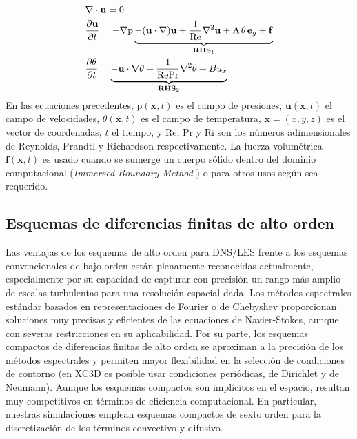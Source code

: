 \begin{equation}
\begin{aligned}
&\nabla \cdot \mathbf{u} = 0 \\
& \frac{\partial \mathbf{u}}{\partial t} = -\nabla \text{p} \underbrace{- (\mathbf{u} \cdot \nabla)\mathbf{u} + \frac{1}{\text{Re}} \nabla^2 \mathbf{u} + \text{A} \hspace{0.5mm} \theta \hspace{0.5mm} \mathbf{e}_g + \mathbf{f} }_{\textbf{RHS}_{1}} \\
& \frac{\partial \theta}{\partial t} = \underbrace{- \mathbf{u} \cdot \nabla \theta + \frac{1}{\text{Re} \text{Pr}} \nabla^2 \theta + B u_x }_{\textbf{RHS}_2} \\
\end{aligned}
\label{eq:sistem2}
\end{equation}
En las ecuaciones precedentes, $\text{p}(\mathbf{x},t)$ es el campo de presiones, $\mathbf{u}(\mathbf{x},t)$ el campo de velocidades, $\theta(\mathbf{x},t)$ es el campo de temperatura, $\mathbf{x} = (x,y,z)$ es el vector de coordenadas, $t$ el tiempo, y Re, Pr y Ri son los números adimensionales de Reynolds, Prandtl y Richardson respectivamente. La fuerza volumétrica $\mathbf{f}(\mathbf{x},t)$ es usado cuando se sumerge un cuerpo sólido dentro del dominio computacional (\textit{Immersed Boundary Method} \cite{peskin2002immersed}) o para otros usos según sea requerido.

\subsection{Esquemas de diferencias finitas de alto orden}

Las ventajas de los esquemas de alto orden para DNS/LES frente a los esquemas convencionales de bajo orden están plenamente reconocidas actualmente, especialmente por su capacidad de capturar con precisión un rango más amplio de escalas turbulentas para una resolución espacial dada. Los métodos espectrales estándar basados en representaciones de Fourier o de Chebyshev proporcionan soluciones muy precisas y eficientes de las ecuaciones de Navier-Stokes, aunque con severas restricciones en su aplicabilidad. Por su parte, los esquemas compactos de diferencias finitas de alto orden se aproximan a la precisión de los métodos espectrales y permiten mayor flexibilidad en la selección de condiciones de contorno (en XC3D es posible usar condiciones periódicas, de Dirichlet y de Neumann). Aunque los esquemas compactos son implícitos en el espacio, resultan muy competitivos en términos de eficiencia computacional. En particular, nuestras simulaciones emplean esquemas compactos de sexto orden para la discretización de los términos convectivo y difusivo.

